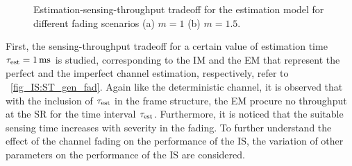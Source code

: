 {\begin{figure}[!ht]
{\label{fig_IS:EST_m1}}
\hfil
{}
\vspace{4mm}
\caption{Estimation-sensing-throughput tradeoff for the estimation model for different fading scenarios (a) $m = 1$ (b) $m = 1.5$.} 
\label{fig_IS:EST_fad}
\end{figure}



First, the sensing-throughput tradeoff for a certain value of estimation time $\tau_{\text{est}} = \SI{1}{ms}$ is studied, corresponding to the IM and the EM that represent the perfect and the imperfect channel estimation, respectively, refer to \figurename~\ref{fig_IS:ST_gen_fad}. Again like the deterministic channel, it is observed that with the inclusion of $\tau_{\text{est}}$ in the frame structure, the EM procure no throughput at the SR for the time interval $\tau_{\text{est}}$. Furthermore, it is noticed that the suitable sensing time increases with severity in the fading. To further understand the effect of the channel fading on the performance of the IS, the variation of other parameters on the performance of the IS are considered.


}
